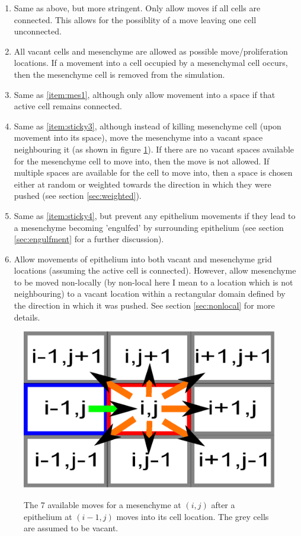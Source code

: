 \documentclass[pdftex,10pt,a4paper]{article}
\begin{document}
\begin{enumerate}
\begin{enumerate}
\item Same as above, but more stringent. Only allow moves if all cells are connected. This allows for the possiblity of a move leaving one cell unconnected.\label{item:sticky2}
\item All vacant cells and mesenchyme are allowed as possible move/proliferation locations. If a movement into a cell occupied by a mesenchymal cell occurs, then the mesenchyme cell is removed from the simulation.\label{item:mes1}
\item Same as \ref{item:mes1}, although only allow movement into a space if that active cell remains connected. \label{item:sticky3}
\item Same as \ref{item:sticky3}, although instead of killing mesenchyme cell (upon movement into its space), move the mesenchyme into a vacant space neighbouring it (as shown in figure \ref{fig:8NN}). If there are no vacant spaces available for the mesenchyme cell to move into, then the move is not allowed. If multiple spaces are available for the cell to move into, then a space is chosen either at random or weighted towards the direction in which they were pushed (see section \ref{sec:weighted}).\label{item:sticky4}
\item Same as \ref{item:sticky4}, but prevent any epithelium movements if they lead to a mesenchyme becoming 'engulfed' by surrounding epithelium (see section \ref{sec:engulfment} for a further discussion).\label{item:sticky5}
\item Allow movements of epithelium into both vacant and mesenchyme grid locations (assuming the active cell is connected). However, allow mesenchyme to be moved non-locally (by non-local here I mean to a location which is not neighbouring) to a vacant location within a rectangular domain defined by the direction in which it was pushed. See section \ref{sec:nonlocal} for more details.\label{item:sticky6}
\end{enumerate}
\end{enumerate}


\begin{figure}[ht] 
\centering
\scalebox{0.5} 
{\includegraphics{8-NN.eps}}
\caption{The 7 available moves for a mesenchyme at $(i,j)$ after a epithelium at $(i-1,j)$ moves into its cell location. The grey cells are assumed to be vacant.}\label{fig:8NN}
\end{figure} 
\end{document}

